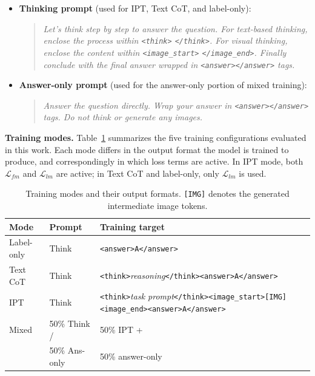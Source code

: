 \begin{itemize}
    \item \textbf{Thinking prompt} (used for IPT, Text CoT, and label-only):

    \begin{quote}\small
    \textit{Let's think step by step to answer the question. For text-based thinking, enclose the process within \texttt{<think>} \texttt{</think>}. For visual thinking, enclose the content within \texttt{<image\_start>} \texttt{</image\_end>}. Finally conclude with the final answer wrapped in \texttt{<answer></answer>} tags.}
    \end{quote}

    \item \textbf{Answer-only prompt} (used for the answer-only portion of mixed training):

    \begin{quote}\small
    \textit{Answer the question directly. Wrap your answer in \texttt{<answer></answer>} tags. Do not think or generate any images.}
    \end{quote}
\end{itemize}

\noindent\textbf{Training modes.}
Table~\ref{tab:supp_modes} summarizes the five training configurations evaluated in this work.
Each mode differs in the output format the model is trained to produce, and correspondingly in which loss terms are active.
In IPT mode, both $\mathcal{L}_{fm}$ and $\mathcal{L}_{lm}$ are active; in Text CoT and label-only, only $\mathcal{L}_{lm}$ is used.

\begin{table}[h]
\centering
\caption{Training modes and their output formats. \texttt{[IMG]} denotes the generated intermediate image tokens.}
\label{tab:supp_modes}
\footnotesize
\setlength{\tabcolsep}{4pt}
\begin{tabular}{llp{5.8cm}}
\toprule
\textbf{Mode} & \textbf{Prompt} & \textbf{Training target} \\
\midrule
Label-only & Think & \texttt{<answer>A</answer>} \\
Text CoT & Think & \texttt{<think>}\textit{reasoning}\texttt{</think>}\newline\texttt{<answer>A</answer>} \\
IPT & Think & \texttt{<think>}\textit{task prompt}\texttt{</think>}\newline\texttt{<image\_start>[IMG]<image\_end>}\newline\texttt{<answer>A</answer>} \\
\midrule
Mixed & 50\% Think / & 50\% IPT + \\
       & 50\% Ans-only & 50\% answer-only \\
\bottomrule
\end{tabular}
\end{table}

